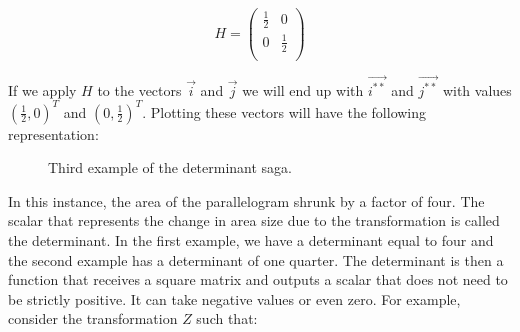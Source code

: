 \documentclass[a4,12pt,twosided,openany]{memoir}
\begin{document}
\[
 H = \begin{pmatrix}
\frac{1}{2} & 0   \\
0 & \frac{1}{2} \\
\end{pmatrix}
\]
\par 
\indent
If we apply $H$ to the vectors $\overrightarrow{i}$ and $\overrightarrow{j}$ we will end up with $\overrightarrow{i^{**}}$ and $\overrightarrow{j^{**}}$ with values $(\frac{1}{2},0)^T$ and $(0,\frac{1}{2})^T$.
\indent
Plotting these vectors will have the following representation:
\begin{figure}[h!]
\begin{center}
\end{center}
\caption{Third example of the determinant saga.}
\end{figure}
\par 
\indent
In this instance, the area of the parallelogram shrunk by a factor of four. The scalar that represents the change in area size due to the transformation is called the determinant. In the first example, we have a determinant equal to four and the second example has a determinant of one quarter. The determinant is then a function that receives a square matrix and outputs a scalar that does not need to be strictly positive. It can take negative values or even zero. For example, consider the transformation $Z$ such that:
\end{document}
